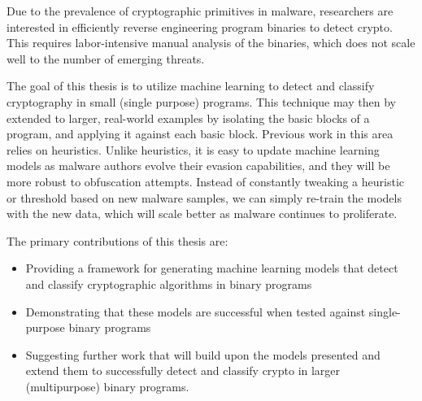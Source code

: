 Due to the prevalence of cryptographic primitives in malware, researchers are interested in efficiently reverse engineering program binaries to detect crypto.  This requires labor-intensive manual analysis of the binaries, which does not scale well to the number of emerging threats.  

The goal of this thesis is to utilize machine learning to detect and classify cryptography in small (single purpose) programs.  This technique may then by extended to larger, real-world examples by isolating the basic blocks of a program, and applying it against each basic block.  Previous work in this area relies on heuristics.  Unlike heuristics, it is easy to update machine learning models as malware authors evolve their evasion capabilities, and they will be more robust to obfuscation attempts.  Instead of constantly tweaking a heuristic or threshold based on new malware samples, we can simply re-train the models with the new data, which will scale better as malware continues to proliferate.

The primary contributions of this thesis are:
\begin{itemize}
	\item Providing a framework for generating machine learning models that detect and classify cryptographic algorithms in binary programs
	\item Demonstrating that these models are successful when tested against single-purpose binary programs
	\item Suggesting further work that will build upon the models presented and extend them to successfully detect and classify crypto in larger (multipurpose) binary programs.
\end{itemize}